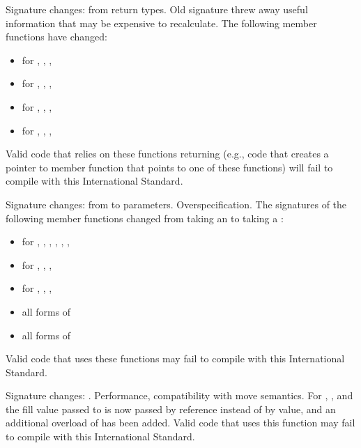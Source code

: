 \change Signature changes: from  return types.
\rationale Old signature threw away useful information that may be expensive
to recalculate.
\effect
The following member functions have changed:
\begin{itemize}
\item {} for , , , 
\item {} for , , , 
\item {} for , , , 
\item {} for , , , 
\end{itemize}

Valid \CppIII{} code that relies on these functions returning 
(e.g., code that creates a pointer to member function that points to one
of these functions) will fail to compile with this International Standard.

\change Signature changes: from  to 
parameters.
\rationale Overspecification.
\effect
The signatures of the following member functions changed from taking an
 to taking a :

\begin{itemize}
\item {} for , , ,
, , , 
\item {} for , , ,
\item {} for , , , 
\item all forms of 
\item all forms of 
\end{itemize}

Valid \CppIII{} code that uses these functions may fail to compile with this
International Standard.

\change Signature changes: .
\rationale Performance, compatibility with move semantics.
\effect
For , , and 
the fill value passed to  is now passed by reference instead of
by value, and an additional overload of  has been added. Valid
\CppIII{} code that uses this function may fail to compile with this International
Standard.


